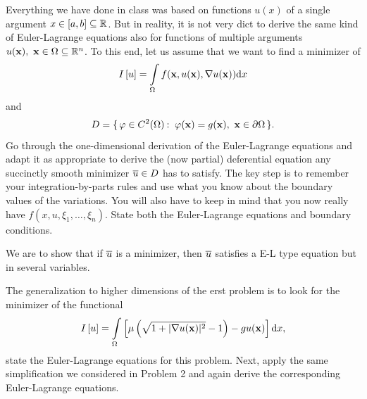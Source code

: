 \documentclass[12pt]{memoir}
\begin{document}
\begin{Ej}
    Everything we have done in class was based on functions $u(x)$ of a
single argument $x\in\left\lbrack a,b\right\rbrack\subseteq\mathbb{R}$. But in reality, it is not very dict to derive the same kind of Euler-Lagrange
equations also for functions of multiple arguments $u(\mathbf{x}),\ \mathbf{x}\in\Omega\subseteq\mathbb{R}^n$.
To this end, let us assume that we want to find a minimizer of
$$I\left\lbrack u\right\rbrack=\int\limits_\Omega f(\mathbf{x},u(\mathbf{x}),\nabla u(\mathbf{x}))\dd x$$
and
$$D=\{\,\varphi\in C^2(\Omega)\mathbin{:}\ \varphi(\mathbf{x})=g(\mathbf{x}),\ \mathbf{x}\in\partial\Omega\,\}.$$
Go through the one-dimensional derivation of the Euler-Lagrange equations and adapt it as appropriate to
derive the (now partial) deferential equation any succinctly smooth minimizer $\overline u\in D$ has to satisfy. The
key step is to remember your integration-by-parts rules and use what you know about the boundary values
of the variations. You will also have to keep in mind that you now really have $f(x, u,\xi_1,\dots,\xi_n)$.
State both the Euler-Lagrange equations and boundary conditions.
\end{Ej}

\begin{ptcbr}
    We are to show that if $\overline u$ is a minimizer, then $\overline u$ satisfies a E-L type equation but in several variables.
\end{ptcbr}
\begin{Ej}
    The generalization to higher dimensions of the erst problem is to
look for the minimizer of the functional
$$I\left\lbrack u\right\rbrack=\int\limits_\Omega\left\lbrack\mu\left(\sqrt{1+|\nabla u(\mathbf{x})|^2}-1\right)-gu(\mathbf{x})\right\rbrack\dd x,$$
state the Euler-Lagrange equations for this problem.
Next, apply the same simplification we considered in Problem 2 and again derive the corresponding
Euler-Lagrange equations.
\end{Ej}
\end{document}
